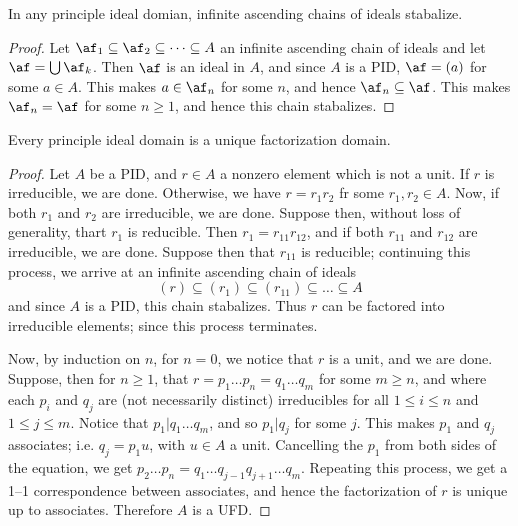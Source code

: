 \begin{lemma}\label{1.7.5}
    In any principle ideal domian, infinite ascending chains of ideals
    stabalize.
\end{lemma}
\begin{proof}
    Let $\af_1 \subseteq \af_2 \subseteq \dots \subseteq A$ an infinite ascending
    chain of ideals and let $\af=\bigcup{\af_k}$. Then $\af$ is an ideal in $A$,
    and since  $A$ is a PID,  $\af=(a)$ for some $a \in A$. This makes  $a \in
    \af_n$ for some  $n$, and hence  $\af_n \subseteq \af$. This makes
    $\af_n=\af$ for some $n \geq 1$, and hence this chain stabalizes.
\end{proof}

\begin{theorem}\label{1.7.6}
    Every principle ideal domain is a unique factorization domain.
\end{theorem}
\begin{proof}
    Let $A$ be a PID, and  $r \in A$ a nonzero element which is not a unit. If
    $r$ is irreducible, we are done. Otherwise, we have  $r=r_1r_2$ fr some
    $r_1,r_2 \in A$. Now, if both $r_1$ and $r_2$ are irreducible, we are done.
    Suppose then, without loss of generality, thart $r_1$ is reducible. Then
    $r_1=r_{11}r_{12}$, and if both $r_{11}$ and $r_{12}$ are irreducible, we
    are done. Suppose then that $r_{11}$ is reducible; continuing this process,
    we arrive at an infinite ascending chain of ideals
    \begin{equation*}
        (r) \subseteq (r_1) \subseteq (r_{11}) \subseteq \dots \subseteq A
    \end{equation*}
    and since $A$ is a PID, this chain stabalizes. Thus $r$ can be factored into
    irreducible elements; since this process terminates.

    Now, by induction on $n$, for  $n=0$, we notice that  $r$ is a unit, and we
    are done. Suppose, then for  $n \geq 1$, that  $r=p_1 \dots p_n=q_1 \dots
    q_m$ for some $m \geq n$, and where each  $p_i$ and  $q_j$ are  (not
    necessarily distinct) irreducibles for all $1 \leq i \leq n$ and $1 \leq j
    \leq m$. Notice that  $p_1|q_1 \dots q_m$, and so $p_1|q_j$ for some $j$.
    This makes  $p_1$ and $q_j$ associates; i.e.  $q_j=p_1u$, with $u \in A$ a
    unit. Cancelling the  $p_1$ from both sides of the equation, we get $p_2
    \dots p_n=q_1 \dots q_{j-1}q_{j+1} \dots q_m$. Repeating this process, we
    get a 1--1 correspondence between associates, and hence the factorization of
    $r$ is unique up to associates. Therefore  $A$ is a UFD.
\end{proof}

